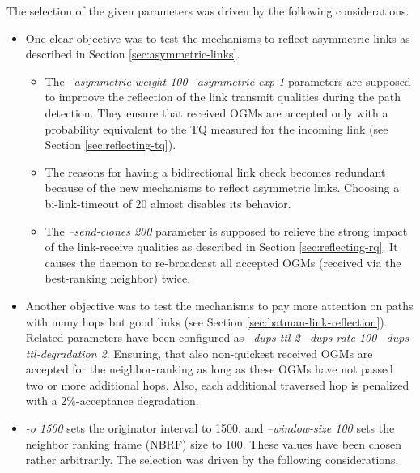\documentclass[11pt]{article}
\begin{document}
The selection of the given parameters was driven by the following considerations.
\begin{itemize}


\item One clear objective was to test the mechanisms to reflect asymmetric links as described in Section \ref{sec:asymmetric-links}.

\begin{itemize}

\item The \emph{--asymmetric-weight 100 --asymmetric-exp 1} parameters are supposed to improove the reflection of the link transmit qualities during the path detection.
%
They ensure that received OGMs are accepted only with a probability equivalent to the TQ measured for the incoming link (see Section \ref{sec:reflecting-tq}).

\item The reasons for having a bidirectional link check becomes redundant because of the new mechanisms to reflect asymmetric links. Choosing a bi-link-timeout of 20 almost disables its behavior.

\item The \emph{--send-clones 200} parameter is supposed to relieve the strong impact of the link-receive qualities as described in Section \ref{sec:reflecting-rq}. It causes the daemon to re-broadcast all accepted OGMs (received via the best-ranking neighbor) twice.

\end{itemize}

\item Another objective was to test the mechanisms to pay more attention on paths with many hops but good links (see Section \ref{sec:batman-link-reflection}).
Related parameters have been configured as \emph{--dups-ttl 2 --dups-rate 100 --dups-ttl-degradation 2}. Ensuring, that also non-quickest received OGMs are accepted for the neighbor-ranking as long as these OGMs have not passed two or more additional hops. Also, each additional traversed hop is penalized with a 2\%-acceptance degradation.


\item \emph{-o 1500} sets the originator interval to 1500. and \emph{--window-size 100} sets the neighbor ranking frame (NBRF) size to 100. These values have been chosen rather arbitrarily. The selection was driven by the following considerations.
\begin{itemize}


\end{itemize}
\end{itemize}
\end{document}
